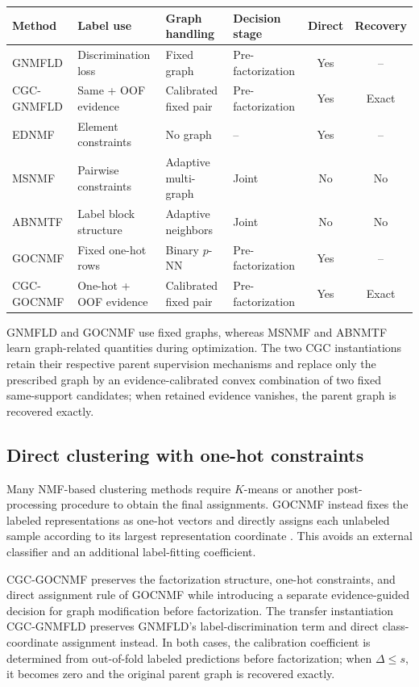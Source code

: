 \documentclass[11pt]{article}
\newenvironment{widetable}
  {\begin{strip}\centering\captionsetup{type=table}}
  {\end{strip}}
\theoremstyle{remark}
\begin{document}
\begin{widetable}
\centering
\caption{Methodological positioning of representative semi-supervised NMF methods.}
\label{tab:method_comparison}
\footnotesize
\setlength{\tabcolsep}{16.0pt}
\begin{tabular}{llllcc}
\toprule
Method & Label use & Graph handling & Decision stage & Direct & Recovery \\
\midrule
GNMFLD & Discrimination loss & Fixed graph & Pre-factorization & Yes & -- \\
CGC-GNMFLD & Same + OOF evidence & Calibrated fixed pair & Pre-factorization & Yes & Exact \\
EDNMF & Element constraints & No graph & -- & Yes & -- \\
MSNMF & Pairwise constraints & Adaptive multi-graph & Joint & No & No \\
ABNMTF & Label block structure & Adaptive neighbors & Joint & No & No \\
GOCNMF & Fixed one-hot rows & Binary $p$-NN & Pre-factorization & Yes & -- \\
CGC-GOCNMF & One-hot + OOF evidence & Calibrated fixed pair & Pre-factorization & Yes & Exact \\
\bottomrule
\end{tabular}%
\end{widetable}

GNMFLD and GOCNMF use fixed graphs, whereas MSNMF and ABNMTF learn graph-related quantities during optimization. The two CGC instantiations retain their respective parent supervision mechanisms and replace only the prescribed graph by an evidence-calibrated convex combination of two fixed same-support candidates; when retained evidence vanishes, the parent graph is recovered exactly.

\subsection{Direct clustering with one-hot constraints}

Many NMF-based clustering methods require $K$-means or another post-processing procedure to obtain the final assignments. GOCNMF instead fixes the labeled representations as one-hot vectors and directly assigns each unlabeled sample according to its largest representation coordinate \cite{Li2025GOCNMF}. This avoids an external classifier and an additional label-fitting coefficient.

CGC-GOCNMF preserves the factorization structure, one-hot constraints, and direct assignment rule of GOCNMF while introducing a separate evidence-guided decision for graph modification before factorization. The transfer instantiation CGC-GNMFLD preserves GNMFLD's label-discrimination term and direct class-coordinate assignment instead. In both cases, the calibration coefficient is determined from out-of-fold labeled predictions before factorization; when $\Delta\le s$, it becomes zero and the original parent graph is recovered exactly.
\end{document}
